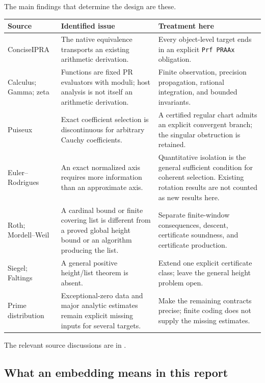 The main findings that determine the design are these.
\begin{center}\small
\begin{longtable}{@{}P{.20\linewidth}P{.34\linewidth}P{.37\linewidth}@{}}
\toprule
Source & Identified issue & Treatment here\\
\midrule\endhead
ConciseIPRA & The native equivalence transports an existing arithmetic
derivation. & Every object-level target ends in an explicit
\texttt{Prf PRAAx} obligation.\\
Calculus; Gamma; zeta & Functions are fixed PR evaluators with moduli;
host analysis is not itself an arithmetic derivation. & Finite observation,
precision propagation, rational integration, and bounded invariants.\\
Puiseux & Exact coefficient selection is discontinuous for arbitrary
Cauchy coefficients. & A certified regular chart admits an explicit
convergent branch; the singular obstruction is retained.\\
Euler--Rodrigues & An exact normalized axis requires more information than
an approximate axis. & Quantitative isolation is the general sufficient
condition for coherent selection.  Existing rotation results are not
counted as new results here.\\
Roth; Mordell--Weil & A cardinal bound or finite covering list is different
from a proved global height bound or an algorithm producing the list. &
Separate finite-window consequences, descent, certificate soundness, and
certificate production.\\
Siegel; Faltings & A general positive height/list theorem is absent. &
Extend one explicit certificate class; leave the general height problem
open.\\
Prime distribution & Exceptional-zero data and major analytic estimates
remain explicit missing inputs for several targets. & Make the remaining
contracts precise; finite coding does not supply the missing estimates.\\
\bottomrule
\end{longtable}
\end{center}
The relevant source discussions are in
\cite{repoCore,repoCalculus,repoGamma,repoZeta,repoPuiseux,repoObstruction,repoRotation,
repoRoth,repoMordell,repoSiegel,repoFaltings,repoPrimes}.

\subsection{What an embedding means in this report}

